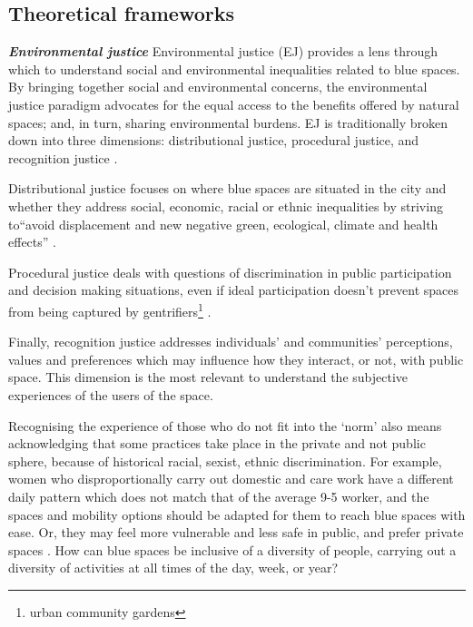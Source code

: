 \documentclass{article}
\newcommand{\bisection}[1]{\textbf{\textit{#1}}}
\begin{document}
\subsection{Theoretical frameworks}

\bisection{Environmental justice}
Environmental justice (EJ) provides a lens through which to understand social and environmental inequalities related to blue spaces. By bringing together social and environmental concerns, the environmental justice paradigm advocates for the equal access to the benefits offered by natural spaces; and, in turn, sharing environmental burdens. 
EJ is traditionally broken down into three dimensions: distributional justice, procedural justice, and recognition justice \parencite{todo:cite schlosberg}.

Distributional justice focuses on where blue spaces are situated in the city and whether they address social, economic, racial or ethnic inequalities by striving to``avoid displacement and new negative green, ecological, climate and health effects'' \parencite{anguelovski2020expanding}.

Procedural justice deals with questions of discrimination in public participation and decision making situations, even if ideal participation doesn't prevent spaces from being captured by gentrifiers\footnote{urban community gardens} \parencite{anguelovski2020expanding}. 

Finally, recognition justice addresses individuals' and communities’ perceptions, values and preferences which may influence how they interact, or not, with public space. This dimension is the most relevant to understand the subjective experiences of the users of the space.

Recognising the experience of those who do not fit into the `norm' also means acknowledging that some practices take place in the private and not public sphere, because of historical racial, sexist, ethnic discrimination. For example, women who disproportionally carry out domestic and care work have a different daily pattern which does not match that of the average 9-5 worker, and the spaces and mobility options should be adapted for them to reach blue spaces with ease. Or, they may feel more vulnerable and less safe in public, and prefer private spaces \parencite{wessells2014urban}. How can blue spaces be inclusive of a diversity of people, carrying out a diversity of activities at all times of the day, week, or year? 
\end{document}
